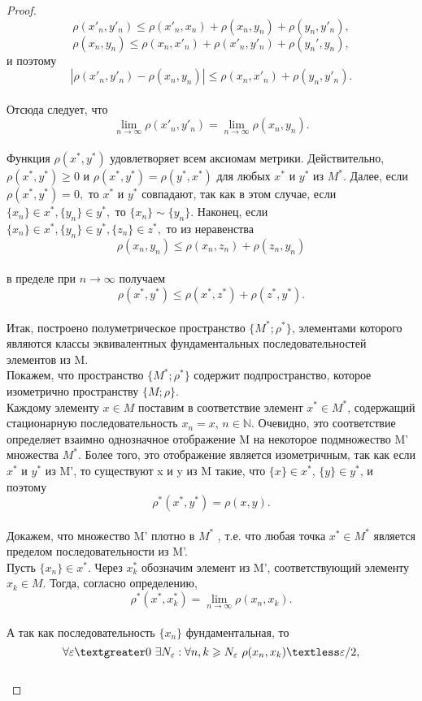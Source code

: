 \begin{proof}
$$ \rho(x'_n,y'_n ) \leq \rho(x'_n,x_n) + \rho(x_n,y_n) + \rho(y_n,y'_n ),$$
$$\rho(x_n,y_n) \leq \rho(x_n,x'_n) + \rho(x'_n,y'_n ) + \rho(y_n' ,y_n),$$
и поэтому
$$ |\rho(x'_n,y'_n ) - \rho(x_n,y_n)| \leq \rho(x_n,x'_n) + \rho(y_n,y'_n ).$$\\
Отсюда следует, что
$$\lim\limits_{n\to \infty} \rho(x'_n,y'_n)= \lim\limits_{n\to \infty} \rho(x_n,y_n).$$\\
Функция $\rho(x^*,y^*)$ удовлетворяет всем аксиомам метрики. Действительно, $\rho(x^*,y^*) \geq 0$ и $\rho(x^*,y^*) = \rho(y^*,x^*)$ для любых $x^*$ и $y^*$ из $M^*$. Далее, если $\rho(x^*,y^*) = 0,$ то $x^*$ и $y^*$ совпадают, так как в этом случае, если $\{x_n\} \in x^*, \{y_n\} \in y^*,$ то $\{x_n\} \sim \{y_n\}.$ Наконец, если $\{x_n\} \in x^*, \{y_n\} \in y^*, \{z_n\} \in z^*,$ то из неравенства
$$\rho(x_n,y_n) \leq \rho(x_n,z_n) + \rho(z_n,y_n)$$\\
в пределе при $ n \rightarrow \infty$ получаем\\
$$\rho(x^*,y^*) \leq \rho(x^*,z^*) + \rho(z^*,y^*).$$\\
Итак, построено полуметрическое пространство $\{M^*;\rho^* \}$, элементами которого являются классы эквивалентных фундаментальных последовательностей элементов из M.\\
Покажем, что пространство $\{M^*;\rho^* \}$ содержит подпространство, которое изометрично пространству $\{M;\rho \}$.\\
Каждому элементу $x \in M$ поставим в соответствие элемент $x^* \in M^*$, содержащий стационарную последовательность $x_n = x$, $n \in \mathds{N}.$ Очевидно, это соответствие определяет взаимно однозначное отображение M на некоторое подмножество M' множества $M^*.$ Более того, это отображение является изометричным, так как если $x^*$ и $y^*$ из M', то существуют x и y из M такие, что $\{x\} \in x^*$, $\{y\} \in y^*$, и поэтому\\
$$\rho^*(x^*,y^*) = \rho(x,y).$$\\
Докажем, что множество M' плотно в $M^*$ , т.е. что любая точка $x^* \in M^*$ является пределом последовательности из M'.\\
Пусть $\{x_n\} \in x^*$. Через $x^*_k$ обозначим элемент из M', соответствующий элементу $x_k \in M.$ Тогда, согласно определению,\\
$$\rho^*(x^*,x^*_k) = \lim\limits_{n\to \infty} \rho(x_n,x_k).$$\\
А так как последовательность $\{x_n\}$ фундаментальная, то\\
$$\forall \epsilon \textgreater 0 \   \exists N_\epsilon: \forall n,k\geq N_\epsilon \   \rho(x_n,x_k)\textless \epsilon/2,$$\\

\end{proof}
